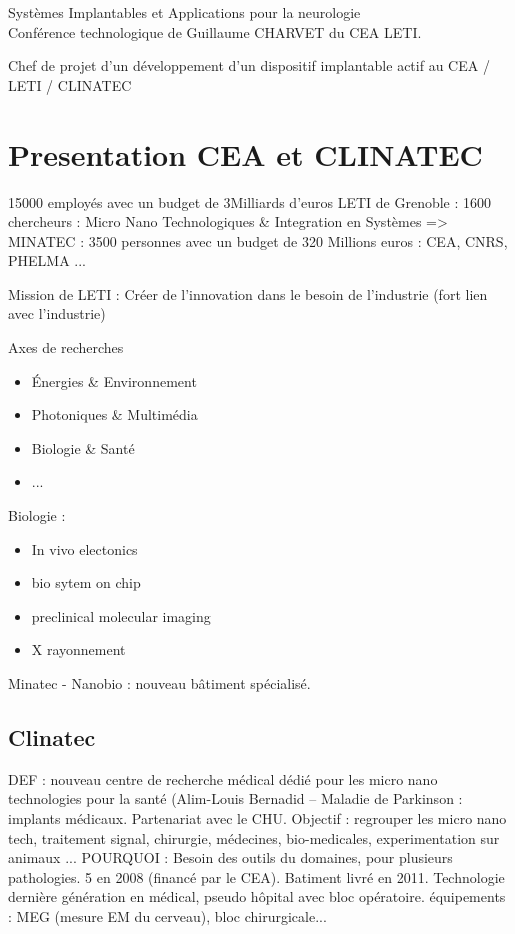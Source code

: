 \documentclass[a4paper,12pt]{article}
\begin{document}
\begin{center}
\Large{Systèmes Implantables et Applications pour la neurologie}\\
\vspace{0.4cm}
\normalsize{Conférence technologique de Guillaume CHARVET du CEA LETI.}\\
\end{center}

Chef de projet d'un développement d'un dispositif implantable actif au CEA / LETI / CLINATEC
\section{Presentation CEA et CLINATEC}
15000 employés avec un budget de 3Milliards d'euros
LETI de Grenoble : 1600 chercheurs : Micro Nano Technologiques \& Integration en Systèmes
 => MINATEC : 3500 personnes avec un budget de 320 Millions euros : CEA, CNRS, PHELMA ...

Mission de LETI :
Créer de l'innovation dans le besoin de l'industrie (fort lien avec l'industrie)

Axes de recherches
\begin{itemize}
\item Énergies \& Environnement
\item Photoniques \& Multimédia
\item Biologie \& Santé 
\item ...
\end{itemize}

Biologie :
\begin{itemize}
\item In vivo electonics
\item bio sytem on chip
\item preclinical molecular imaging 
\item X rayonnement
\end{itemize}

Minatec - Nanobio : nouveau bâtiment spécialisé.

\subsection{Clinatec} 
DEF :  nouveau centre de recherche médical dédié pour les micro nano technologies pour la santé (Alim-Louis Bernadid -- Maladie de Parkinson : implants médicaux.
Partenariat avec le CHU.
Objectif : regrouper les micro nano tech, traitement signal, chirurgie, médecines, bio-medicales, experimentation sur animaux ...
POURQUOI : Besoin des outils du domaines, pour plusieurs pathologies.
5 en 2008 (financé par le CEA). Batiment livré en 2011. Technologie dernière génération en médical, pseudo hôpital avec bloc opératoire.
équipements : MEG (mesure EM du cerveau), bloc chirurgicale...
\end{document}
